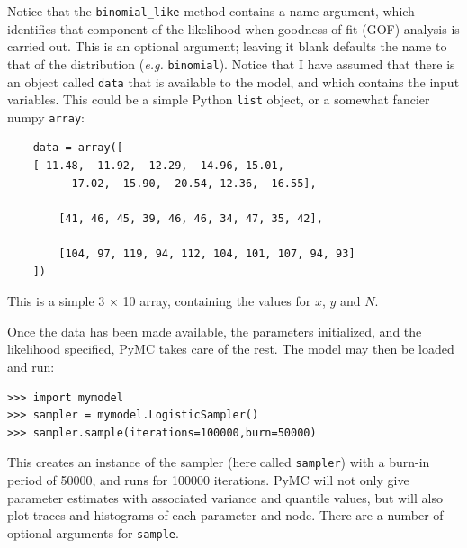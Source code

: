 \documentclass[]{book}
\begin{document}
Notice that the \verb=binomial_like= method contains a name argument, which identifies that component of the likelihood when goodness-of-fit (GOF) analysis is carried out. This is an optional argument; leaving it blank defaults the name to that of the distribution (\emph{e.g.} \verb=binomial=). Notice that I have assumed that there is an object called \verb=data= that is available to the model, and which contains the input variables. This could be a simple Python \verb=list= object, or a somewhat fancier numpy \verb=array=:

\begin{verbatim}
	data = array([
   	[ 11.48,  11.92,  12.29,  14.96, 15.01,  
		  17.02,  15.90,  20.54, 12.36,  16.55],
		
		[41, 46, 45, 39, 46, 46, 34, 47, 35, 42],
		
		[104, 97, 119, 94, 112, 104, 101, 107, 94, 93]
	])
\end{verbatim}
This is a simple 3 $\times$ 10 array, containing the values for $x$, $y$ and $N$.

Once the data has been made available, the parameters initialized, and the likelihood specified, PyMC takes care of the rest. The model may then be loaded and run:
\begin{verbatim}
>>> import mymodel
>>> sampler = mymodel.LogisticSampler()
>>> sampler.sample(iterations=100000,burn=50000)
\end{verbatim}
This creates an instance of the sampler (here called \verb=sampler=) with a burn-in period of 50000, and runs for 100000 iterations. PyMC will not only give parameter estimates with associated variance and quantile values, but will also plot traces and histograms of each parameter and node. There are a number of optional arguments for \verb=sample=.
\end{document}
